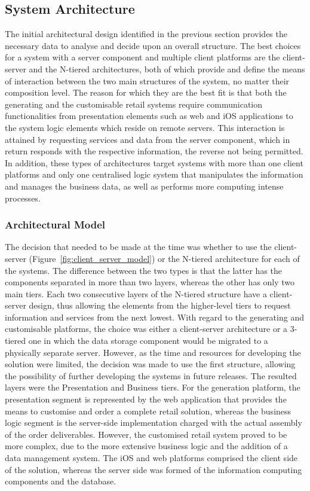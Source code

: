 \subsection{System Architecture}

The initial architectural design identified in the previous section provides the necessary data to analyse and decide upon an overall structure. The best choices for a system with a server component and multiple client platforms are the client-server and the N-tiered architectures, both of which provide and define the means of interaction between the two main structures of the system, no matter their composition level. The reason for which they are the best fit is that both the generating and the customisable retail systems require communication functionalities from presentation elements such as web and iOS applications to the system logic elements which reside on remote servers. This interaction is attained by requesting services and data from the server component, which in return responds with the respective information, the reverse not being permitted. In addition, these types of architectures target systems with more than one client platforms and only one centralised logic system that manipulates the information and manages the business data, as well as performs more computing intense processes.\\

\subsubsection{Architectural Model}

The decision that needed to be made at the time was whether to use the client-server (Figure~\ref{fig:client_server_model}) or the N-tiered architecture for each of the systems. The difference between the two types is that the latter has the components separated in more than two layers, whereas the other has only two main tiers. Each two consecutive layers of the N-tiered structure have a client-server design, thus allowing the elements from the higher-level tiers to request information and services from the next lowest. With regard to the generating and customisable platforms, the choice was either a client-server architecture or a 3-tiered one in which the data storage component would be migrated to a physically separate server. However, as the time and resources for developing the solution were limited, the decision was made to use the first structure, allowing the possibility of further developing the systems in future releases. The resulted layers were the Presentation and Business tiers. For the generation platform, the presentation segment is represented by the web application that provides the means to customise and order a complete retail solution, whereas the business logic segment is the server-side implementation charged with the actual assembly of the order deliverables. However, the customised retail system proved to be more complex, due to the more extensive business logic and the addition of a data management system. The iOS and web platforms comprised the client side of the solution, whereas the server side was formed of the information computing components and the database.\\

